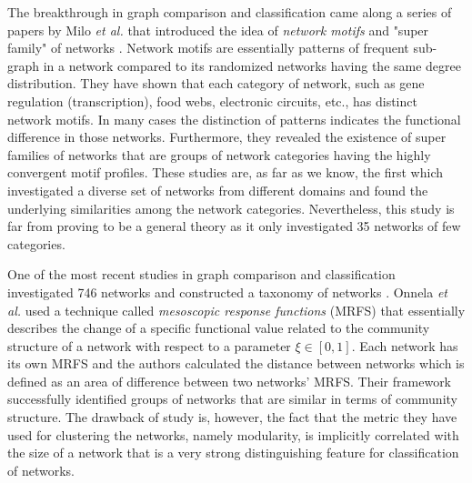 	The breakthrough in graph comparison and classification came along a series of papers by Milo \textit{et al.} that introduced the idea of \textit{network motifs} and "super family" of networks \cite{Milo_motif, Milo_SuperFamily}. Network motifs are essentially patterns of frequent sub-graph in a network compared to its randomized networks having the same degree distribution\cite{Milo_motif}. They have shown that each category of network, such as gene regulation (transcription), food webs, electronic circuits, etc., has distinct network motifs. In many cases the distinction of patterns indicates the functional difference in those networks. Furthermore, they revealed the existence of super families of networks that are groups of network categories having the highly convergent motif profiles. These studies are, as far as we know, the first which investigated a diverse set of networks from different domains and found the underlying similarities among the network categories. Nevertheless, this study is far from proving to be a general theory as it only investigated 35 networks of few categories. 
	
	One of the most recent studies in graph comparison and classification investigated 746 networks and constructed a taxonomy of networks \cite{Onnela_Taxonomy}.  Onnela \textit{et al.} used a technique called \textit{mesoscopic response functions} (MRFS) that essentially describes the change of a specific functional value related to the community structure of a network with respect to a parameter $\xi \in [0,1]$. Each network has its own MRFS and the authors calculated the distance between networks which is defined as an area of difference between two networks' MRFS. Their framework successfully identified groups of networks that are similar in terms of community structure. The drawback of study is, however, the fact that the metric they have used for clustering the networks, namely modularity, is implicitly correlated with the size of a network that is a very strong distinguishing feature for classification of networks.

	
	

